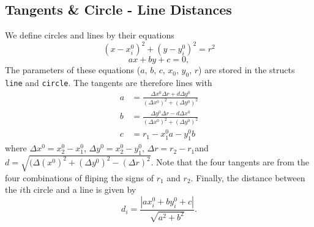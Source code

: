 \documentclass[11pt]{article}
\begin{document}
\subsection{Tangents \& Circle - Line Distances}
\label{sec:tangents}
We define circles and lines by their equations
\begin{equation}
    (x - x^0_i)^2 + (y - y^0_i)^2 = r^2
    \label{eq:circle}
\end{equation}
\begin{equation}
    ax + by + c = 0,
    \label{eq:line}
\end{equation}
The parameters of these equations ($a$, $b$, $c$, $x_0$, $y_0$, $r$) are stored in the structs \texttt{line} and \texttt{circle}. The tangents are therefore \cite{circle-tangents} lines with
\begin{equation}\label{eq:tange/nts}
\begin{split}
    a &= \frac{\Delta x^0  \Delta r + d\Delta y^0}{(\Delta x^0)^2 + (\Delta y^0)^2}\\%
    b &= \frac{\Delta y^0 \Delta r - d\Delta x^0}{(\Delta x^0)^2 + (\Delta y^0)^2}\\
    c &= r_1 - x^0_1a - y^0_1b
\end{split}
\end{equation}
where $\Delta x^0 = x^0_2 - x^0_1$, $\Delta y^0 = x^0_2 - y^0_1$, $\Delta r=r_2 - r_1$and $d=\sqrt{(\Delta (x^0)^2 + (\Delta y^0)^2-(\Delta r)^2}$. Note that the four tangents are from the four combinations of fliping the signs of $r_1$ and $r_2$. Finally, the distance between the $i$th circle and a line is given by
\begin{equation}
    d_i = \frac{|{ax^0_i + by^0_i + c}|}{\sqrt{a^2 + b^2}}.
    \label{eq:dist}
\end{equation}
\end{document}
